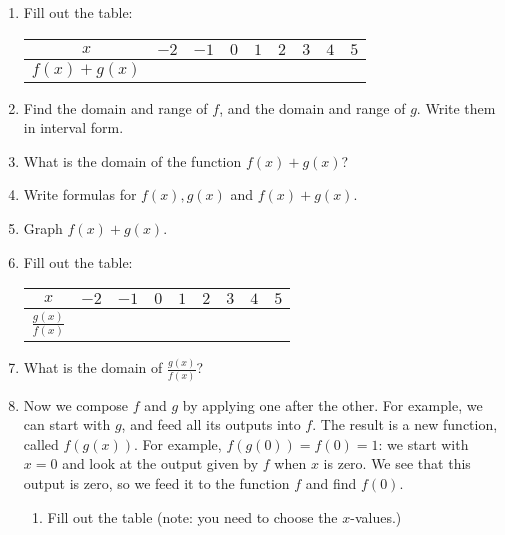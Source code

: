 \documentclass[11pt,dvipsnames]{article}
\begin{document}
\begin{enumerate}[label=$\blacktriangleright$ {\bf  \arabic*:}]

\item Fill out the table:


\begin{minipage}{\linewidth}
\centering
{} %
\begin{tabularx}{0.8\textwidth}{|X|X|X|X|X|X|X|X|X|X|}
\hline
\multicolumn{2}{|c|}{$x$}         &$-2$&$-1$& $0$ & $1$ & $2$ & $3$ & $4$ & $5$ \\ \hline
\multicolumn{2}{|c|}{$f(x)+g(x)$}   & & &     &     &     &     &     &     \\ \hline
\end{tabularx}
\end{minipage}

\item Find the domain and range of $f$, and the domain and range of $g$. Write them in interval form.
\item What is the domain of the function $f(x)+g(x)$?
\item Write formulas for $f(x), g(x)$ and $f(x)+g(x)$. 
\item Graph $f(x)+g(x)$.
\item \label{ettob} Fill out the table:

\begin{minipage}{\linewidth}
\centering
{} \label{tab:ettob1}  
\begin{tabularx}{0.8\textwidth}{|X|X|X|X|X|X|X|X|X|X|}
\hline
\multicolumn{2}{|c|}{$x$}         & $-2$ & $-1$ & $0$ & $1$ & $2$ & $3$ & $4$ & $5$ \\ \hline
\multicolumn{2}{|c|}{$\displaystyle \frac{g(x)}{f(x)}$} & &      &     &     &     &     &     &     \\ \hline
\end{tabularx}
\end{minipage}

\item What is the domain of $\displaystyle \frac{g(x)}{f(x)}$?
\item Now we compose $f$ and $g$ by applying one after the other. For example, we can start with $g$, and feed all its outputs into $f$. The result is a new function, called $f(g(x))$. For example, $f(g(0))=f(0)=1$: we start with $x=0$ and look at the output given by $f$ when $x$ is zero. We see that this output is zero, so we feed it to the function $f$ and find $f(0)$.
\begin{enumerate}[label=\textcolor{blue}{\bf (\alph*)}]
	\item Fill out the table (note: you need to choose the $x$-values.)
	

\end{enumerate}
\end{enumerate}
\end{document}
